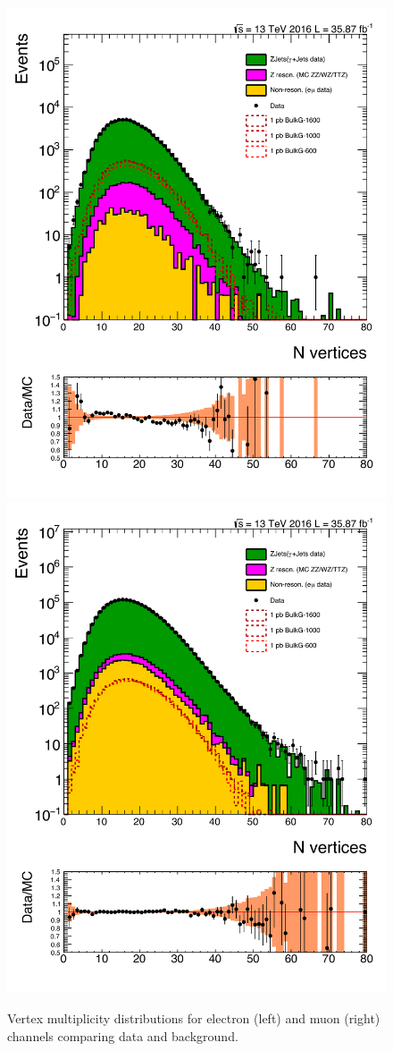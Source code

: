 \begin{figure}[htbp!]
\centering
\includegraphics[width=0.46\linewidth, page=1]{figures/ReMiniSummer16_DT_PhReMiniMCRcFixXsec_GMCPhPtWt_tightzpt50_puWeightsummer16_muoneg_gjet_metfilter_unblind_el_log_1pb.pdf}
\includegraphics[width=0.46\linewidth, page=1]{figures/ReMiniSummer16_DT_PhReMiniMCRcFixXsec_GMCPhPtWt_tightzpt50_puWeightsummer16_muoneg_gjet_metfilter_unblind_mu_log_1pb.pdf}
\caption{Vertex multiplicity distributions for electron (left) and muon (right) channels
comparing data and background.}
\label{fig:gjet_nvtx}
\end{figure}


